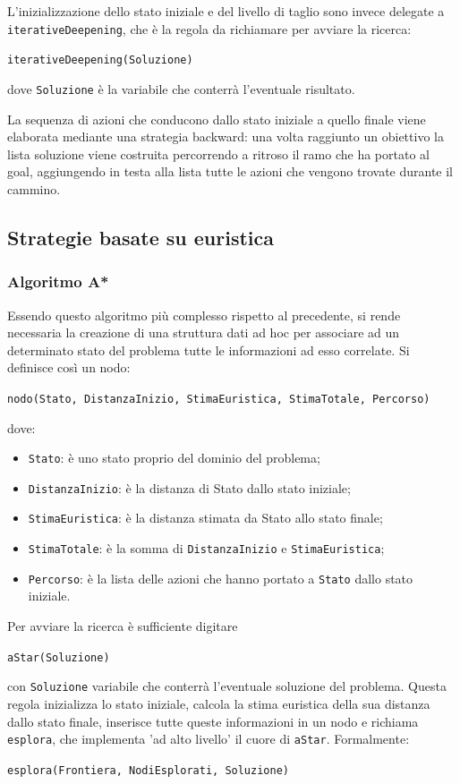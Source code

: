 \documentclass[a4paper,oneside,12pt]{book}
\def \code#1{\texttt{#1}}
\begin{document}
	L’inizializzazione dello stato iniziale e del livello di taglio sono invece delegate a \code{iterativeDeepening}, che è la regola da richiamare per avviare la ricerca:

	\begin{center}
		\code{iterativeDeepening(Soluzione)}
	\end{center}
	dove \code{Soluzione} è la variabile che conterrà l’eventuale risultato.

	La sequenza di azioni che conducono dallo stato iniziale a quello finale viene 		elaborata mediante una strategia backward: una volta raggiunto un obiettivo la lista 		soluzione viene costruita percorrendo a ritroso il ramo che ha portato al goal, 			aggiungendo in testa alla lista tutte le azioni che vengono trovate durante il cammino.

	\subsection*{Strategie basate su euristica}
	\subsubsection{Algoritmo A*}
	Essendo questo algoritmo più complesso rispetto al precedente, si rende necessaria la creazione di una struttura dati ad hoc per associare ad un determinato stato del problema tutte le informazioni ad esso correlate. Si definisce così un nodo:
	\begin{center}
		\code{nodo(Stato, DistanzaInizio, StimaEuristica, StimaTotale, Percorso)}
	\end{center}
	dove:
	\begin{itemize}
		\item \code{Stato}: è uno stato proprio del dominio del problema;
		\item \code{DistanzaInizio}: è la distanza di Stato dallo stato iniziale;
		\item \code{StimaEuristica}: è la distanza stimata da Stato allo stato finale;
		\item \code{StimaTotale}: è la somma di \code{DistanzaInizio} e \code{StimaEuristica};
		\item \code{Percorso}: è la lista delle azioni che hanno portato a \code{Stato} dallo stato iniziale.
	\end{itemize}
	Per avviare la ricerca è sufficiente digitare
	\begin{center}
		\code{aStar(Soluzione)}
	\end{center}
	con \code{Soluzione} variabile che conterrà l’eventuale soluzione del problema. Questa regola inizializza lo stato iniziale, calcola la stima euristica della sua distanza dallo stato finale, inserisce tutte queste informazioni in un nodo e richiama \code{esplora}, che implementa 'ad alto livello' il cuore di \code{aStar}. Formalmente:
	\begin{center}

		\code{esplora(Frontiera, NodiEsplorati, Soluzione)}
	\end{center}
\end{document}
